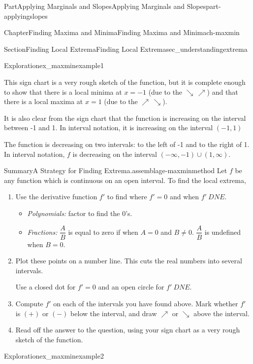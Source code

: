 \documentclass[oneside,10pt,]{tufte-book}
\numberwithin{equation}{chapter}
\begin{document}
\begin{partptx}{Part}{Applying Marginals and Slopes}{}{Applying Marginals and Slopes}{}{}{part-applyingslopes}
\begin{chapterptx}{Chapter}{Finding Maxima and Minima}{}{Finding Maxima and Minima}{}{}{ch-maxmin}
\begin{sectionptx}{Section}{Finding Local Extrema}{}{Finding Local Extrema}{}{}{sec_understandingextrema}
\begin{exploration}{Exploration}{}{ex_maxminexample1}
\begin{enumerate}[font=\bfseries,label=(\alph*),ref=\alph*]
\begin{image}{0.25}{0.5}{0.25}{}
{\begin{tikzpicture}
\end{tikzpicture}
}%
\end{image}%
%
\par
This sign chart is a very rough sketch of the function, but it is complete enough to show that there is a local minima at \(x=-1\) (due to the \(\searrow\,\nearrow\)) and that there is a local maxima at \(x=1\) (due to the \(\nearrow\,\searrow\)).%
\par
It is also clear from the sign chart that the function is increasing on the interval between -1 and 1.  In interval notation, it is increasing on the interval \((-1,1)\)%
\par
The function is decreasing on two intervals: to the left of -1 and to the right of 1.  In interval notation, \(f\) is decreasing on the interval \((-\infty, -1)\cup (1,\infty)\).%
\end{enumerate}%
\end{exploration}%
\begin{assemblage}{Summary}{A Strategy for Finding Extrema.}{assemblage-maxminmethod}%
Let \(f\) be any function which is continuous on an open interval. To find the local extrema,%
\begin{enumerate}
\item{}Use the derivative function \(f'\) to find where \(f'=0\) and when \(f'\ DNE\).%
\begin{itemize}[label=\textbullet]
\item{}\emph{Polynomials:} factor to find the 0's.%
\item{}\emph{Fractions:} \(\dfrac{A}{B}\) is equal to zero if when \(A=0\) and \(B\neq 0\). \(\dfrac{A}{B}\) is undefined when \(B=0\).%
\end{itemize}
%
\item{}Plot these points on a number line. This cuts the real numbers into several intervals.%
\par
Use a closed dot for \(f'=0\) and an open circle for \(f'\ DNE\).%
\item{}Compute \(f'\) on each of the intervals you have found above. Mark whether \(f'\) is \((+)\) or \((-)\) below the interval, and draw \(\nearrow\) or \(\searrow\) above the interval.%
\item{}Read off the answer to the question, using your sign chart as a very rough sketch of the function.%
\end{enumerate}
%
\end{assemblage}
\begin{exploration}{Exploration}{}{ex_maxminexample2}%

\end{exploration}
\end{sectionptx}
\end{chapterptx}
\end{partptx}
\end{document}
